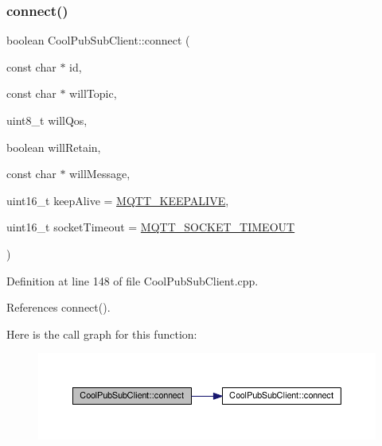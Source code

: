 \subsubsection{\texorpdfstring{connect()}{connect()}\hspace{0.1cm}{\footnotesize\ttfamily [3/4]}}
{\footnotesize\ttfamily boolean Cool\+Pub\+Sub\+Client\+::connect (\begin{DoxyParamCaption}\item[{const char $\ast$}]{id,  }\item[{const char $\ast$}]{will\+Topic,  }\item[{uint8\+\_\+t}]{will\+Qos,  }\item[{boolean}]{will\+Retain,  }\item[{const char $\ast$}]{will\+Message,  }\item[{uint16\+\_\+t}]{keep\+Alive = {\ttfamily \hyperlink{_cool_pub_sub_client_8h_afb4dd8c75385ab30e659314df7c2c335}{M\+Q\+T\+T\+\_\+\+K\+E\+E\+P\+A\+L\+I\+VE}},  }\item[{uint16\+\_\+t}]{socket\+Timeout = {\ttfamily \hyperlink{_cool_pub_sub_client_8h_a092cc564e4d7f03fdab6137e30a7f05b}{M\+Q\+T\+T\+\_\+\+S\+O\+C\+K\+E\+T\+\_\+\+T\+I\+M\+E\+O\+UT}} }\end{DoxyParamCaption})}



Definition at line 148 of file Cool\+Pub\+Sub\+Client.\+cpp.



References connect().

Here is the call graph for this function\+:
\nopagebreak
\begin{figure}[H]
\begin{center}
\leavevmode
\includegraphics[width=350pt]{d8/d4b/class_cool_pub_sub_client_af461a5a08fda1c3237e706965704ddb6_cgraph}
\end{center}
\end{figure}
\mbox{\label{class_cool_pub_sub_client_a7e5a85731dd25d90a41f6d859e61da77}} 
